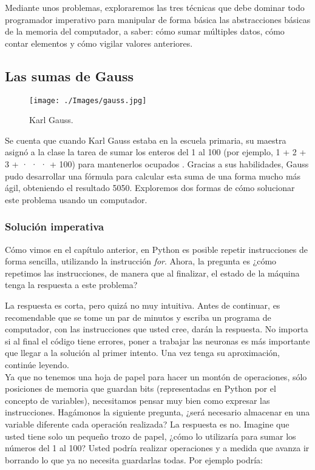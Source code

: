 Mediante unos problemas, exploraremos las tres técnicas que debe dominar todo programador imperativo para manipular de forma básica las abstracciones básicas de la memoria del computador, a saber: cómo sumar múltiples datos, cómo contar elementos y cómo vigilar valores anteriores.

\subsection{Las sumas de Gauss}

\begin{wrapfigure}{r}{0.3\textwidth}
	\begin{center}
		\texttt{[image: ./Images/gauss.jpg]}
	\end{center}	
	\caption{Karl Gauss.}
\end{wrapfigure}

Se cuenta que cuando Karl Gauss estaba en la escuela primaria, su maestra asignó a la clase la tarea de sumar los enteros del 1 al 100 (por ejemplo, 1 + 2 + 3 + · · · + 100) para mantenerlos ocupados \cite[p.~59]{evansIntro}. Gracias a sus habilidades, Gauss pudo desarrollar una fórmula para calcular esta suma de una forma mucho más ágil, obteniendo el resultado 5050. Exploremos dos formas de cómo solucionar este problema usando un computador.

\subsubsection{Solución imperativa}

Cómo vimos en el capítulo anterior, en Python es posible repetir instrucciones de forma sencilla, utilizando la instrucción \emph{for}. Ahora, la pregunta es ¿cómo repetimos las instrucciones, de manera que al finalizar, el estado de la máquina tenga la respuesta a este problema?

La respuesta es corta, pero quizá no muy intuitiva. Antes de continuar, es recomendable que se tome un par de minutos y escriba un programa de computador, con las instrucciones que usted cree, darán la respuesta. No importa si al final el código tiene errores, poner a trabajar las neuronas es más importante que llegar a la solución al primer intento. Una vez tenga su aproximación, continúe leyendo.
\\

Ya que no tenemos una hoja de papel para hacer un montón de operaciones, sólo posiciones de memoria que guardan bits (representadas en Python por el concepto de variables), necesitamos pensar muy bien como expresar las instrucciones. Hagámonos la siguiente pregunta, ¿será necesario almacenar en una variable diferente cada operación realizada? La respuesta es no. Imagine que usted tiene solo un pequeño trozo de papel, ¿cómo lo utilizaría para sumar los números del 1 al 100? Usted podría realizar operaciones y a medida que avanza ir borrando lo que ya no necesita guardarlas todas. Por ejemplo podría:

